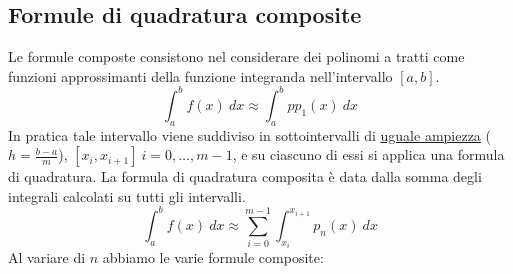 \documentclass{article}
\begin{document}
\subsection{Formule di quadratura composite}
Le formule composte consistono nel considerare dei polinomi a tratti come
funzioni approssimanti della funzione integranda nell'intervallo $[a,b]$.
$$\displaystyle\int_{a}^{b}f(x)\ dx\approx \displaystyle\int_{a}^{b}pp_1(x)\
dx$$
In pratica tale intervallo viene suddiviso in sottointervalli di
\underline{uguale ampiezza} ($h=\frac{b-a}{m}$), $[x_i,x_{i+1}]\
i=0,\ldots,m-1$, e su ciascuno di essi si applica una formula di quadratura.
La formula di quadratura composita è data dalla somma degli integrali
calcolati su tutti gli intervalli.
$$\displaystyle\int_{a}^{b}f(x)\ dx\approx \displaystyle\sum_{i=0}^{m-1}
\displaystyle\int_{x_i}^{x_{i+1}}p_{n}(x)\ dx$$
Al variare di $n$ abbiamo le varie formule composite:
\end{document}
